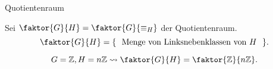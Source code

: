 \documentclass[class=article, crop=false]{standalone}
\begin{document}
\begin{zettel}{Quotientenraum}
\begin{flashcard}
    Sei $\faktor{G}{H} = \faktor{G}{\equiv_H}$ der Quotientenraum.
    \[
        \faktor{G}{H} = \set{\tx{ Menge von Linksnebenklassen von $H$ } }
    .\]
\end{flashcard}

\begin{example}
    \[
        G = \mathbb{Z}, H =  n \mathbb{Z} \rightsquigarrow \faktor{G}{H} =  \faktor{\mathbb{Z}}{n \mathbb{Z}}
    .\]
\end{example}
\end{zettel}
\end{document}
